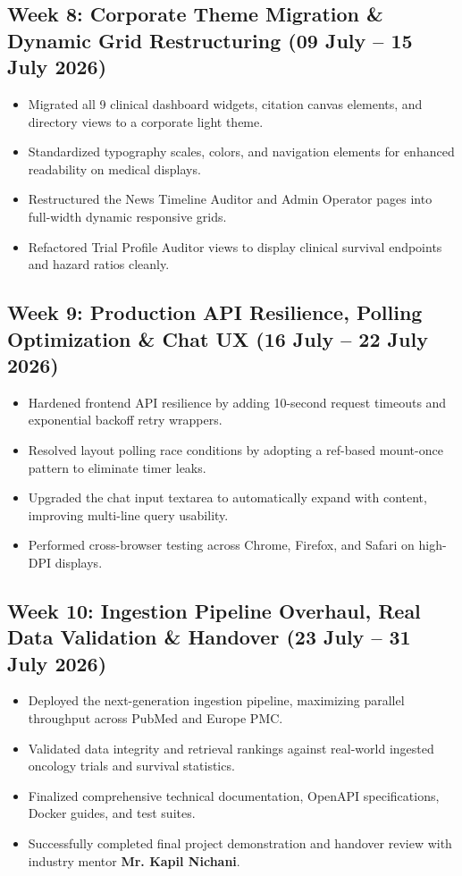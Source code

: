 \documentclass[11pt,a4paper]{article}
\begin{document}
\subsection*{Week 8: Corporate Theme Migration \& Dynamic Grid Restructuring (09 July -- 15 July 2026)}
\begin{itemize}[leftmargin=*,noitemsep]
    \item Migrated all 9 clinical dashboard widgets, citation canvas elements, and directory views to a corporate light theme.
    \item Standardized typography scales, colors, and navigation elements for enhanced readability on medical displays.
    \item Restructured the News Timeline Auditor and Admin Operator pages into full-width dynamic responsive grids.
    \item Refactored Trial Profile Auditor views to display clinical survival endpoints and hazard ratios cleanly.
\end{itemize}

\subsection*{Week 9: Production API Resilience, Polling Optimization \& Chat UX (16 July -- 22 July 2026)}
\begin{itemize}[leftmargin=*,noitemsep]
    \item Hardened frontend API resilience by adding 10-second request timeouts and exponential backoff retry wrappers.
    \item Resolved layout polling race conditions by adopting a ref-based mount-once pattern to eliminate timer leaks.
    \item Upgraded the chat input textarea to automatically expand with content, improving multi-line query usability.
    \item Performed cross-browser testing across Chrome, Firefox, and Safari on high-DPI displays.
\end{itemize}

\subsection*{Week 10: Ingestion Pipeline Overhaul, Real Data Validation \& Handover (23 July -- 31 July 2026)}
\begin{itemize}[leftmargin=*,noitemsep]
    \item Deployed the next-generation ingestion pipeline, maximizing parallel throughput across PubMed and Europe PMC.
    \item Validated data integrity and retrieval rankings against real-world ingested oncology trials and survival statistics.
    \item Finalized comprehensive technical documentation, OpenAPI specifications, Docker guides, and test suites.
    \item Successfully completed final project demonstration and handover review with industry mentor \textbf{Mr. Kapil Nichani}.
\end{itemize}
\end{document}
